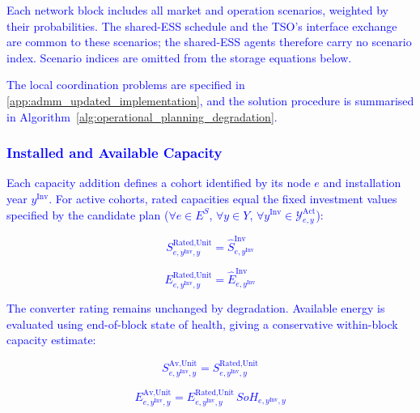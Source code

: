 \documentclass[preprint,12pt]{elsarticle}
\begin{document}
\textcolor{blue}{
    Each network block includes all market and operation scenarios, weighted by their probabilities. The shared-ESS schedule and the TSO's interface exchange are common to these scenarios; the shared-ESS agents therefore carry no scenario index. Scenario indices are omitted from the storage equations below.
}

\textcolor{blue}{
    The local coordination problems are specified in \ref{app:admm_updated_implementation}, and the solution procedure is summarised in Algorithm~\ref{alg:operational_planning_degradation}.
}

\subsubsection{\textcolor{blue}{Installed and Available Capacity}}
\label{subsubsec:capacity}

\textcolor{blue}{
    Each capacity addition defines a cohort identified by its node $e$ and installation year $y^{\text{Inv}}$.
    For active cohorts, rated capacities equal the fixed investment values specified by the candidate plan ($\forall e\in E^S$, $\forall y\in Y$, $\forall y^{\text{Inv}}\in\mathcal{Y}^{\text{Act}}_{e,y}$):
}

\textcolor{blue}{
    \begin{equation}
        S^{\text{Rated,Unit}}_{e,y^\text{Inv},y} = \hat{S}^{\text{Inv}}_{e,y^\text{Inv}}
        \label{eq:cohort_rated}
    \end{equation}
}

\textcolor{blue}{
    \begin{equation}
        E^{\text{Rated,Unit}}_{e,y^\text{Inv},y} = \hat{E}^{\text{Inv}}_{e,y^\text{Inv}}
        \label{eq:cohort_rated_energy}
    \end{equation}
}

\textcolor{blue}{
    The converter rating remains unchanged by degradation. Available energy is evaluated using end-of-block state of health, giving a conservative within-block capacity estimate:
}

\textcolor{blue}{
    \begin{equation}
        S^{\text{Av,Unit}}_{e,y^\text{Inv},y} = S^{\text{Rated,Unit}}_{e,y^\text{Inv},y}
        \label{eq:cohort_available}
    \end{equation}
}

\textcolor{blue}{
    \begin{equation}
        E^{\text{Av,Unit}}_{e,y^\text{Inv},y} = E^{\text{Rated,Unit}}_{e,y^\text{Inv},y}\, SoH_{e,y^\text{Inv},y}
        \label{eq:cohort_available_energy}
    \end{equation}
}
\end{document}

